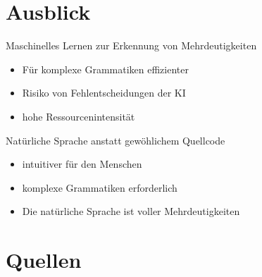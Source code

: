 \documentclass[t]{beamer}
\begin{document}
	\section{Ausblick}\label{sec:ausblick-und-zukunftige-projekte}
	\centering
	\begin{frame}
		\begin{block}{Maschinelles Lernen zur Erkennung von Mehrdeutigkeiten}
			\begin{itemize}
				\item Für komplexe Grammatiken effizienter
				\item Risiko von Fehlentscheidungen der KI
				\item hohe Ressourcenintensität
			\end{itemize}
		\end{block}
		\vspace{1em}
		\begin{block}{Natürliche Sprache anstatt gewöhlichem Quellcode}
			\begin{itemize}
				\item intuitiver für den Menschen
				\item komplexe Grammatiken erforderlich
				\item Die natürliche Sprache ist voller Mehrdeutigkeiten
			\end{itemize}
		\end{block}
	\end{frame}


	\section{Quellen}\label{sec:quellen}
	\begin{frame}[allowframebreaks]
		
		
	\end{frame}
\end{document}
